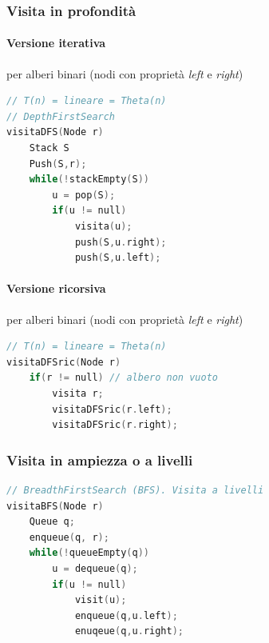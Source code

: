 \documentclass[italian]{article}
\begin{document}
\subsubsection{Visita in profondità}
\paragraph{Versione iterativa} per alberi binari (nodi con proprietà \textit{left} e \textit{right})
\begin{lstlisting}[language=c,mathescape=true]
// T(n) = lineare = Theta(n)
// DepthFirstSearch 
visitaDFS(Node r)
	Stack S
	Push(S,r);
	while(!stackEmpty(S))
		u = pop(S);
		if(u != null)
			visita(u);
			push(S,u.right);
			push(S,u.left);
\end{lstlisting}
\paragraph{Versione ricorsiva} per alberi binari (nodi con proprietà \textit{left} e \textit{right})
\begin{lstlisting}[language=c,mathescape=true]
// T(n) = lineare = Theta(n)
visitaDFSric(Node r)
	if(r != null) // albero non vuoto
		visita r;
		visitaDFSric(r.left);
		visitaDFSric(r.right);		
\end{lstlisting}
\subsubsection{Visita in ampiezza o a livelli}
\begin{lstlisting}[language=c,mathescape=true]
// BreadthFirstSearch (BFS). Visita a livelli
visitaBFS(Node r)
	Queue q;
	enqueue(q, r);
	while(!queueEmpty(q))
		u = dequeue(q);
		if(u != null)
			visit(u);
			enqueue(q,u.left);
			enuqeue(q,u.right);
\end{lstlisting}
\end{document}
